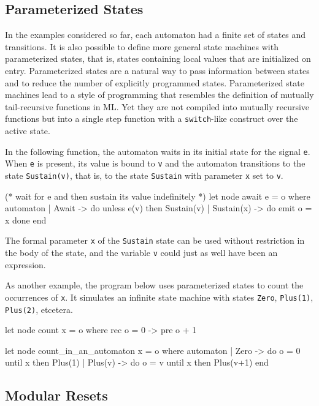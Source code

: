 \documentclass[11pt,titlepage,twoside]{report}
\makeatletter
\newcommand{\zls}[1]{{\@span{class="zelusinline"}#1}}
\newcommand{\zls}[1]{\texttt{#1}}
\renewcommand{\zls}[1]{\texttt{#1}}
\makeatother
\begin{document}
\subsection{Parameterized States\label{paramstates}} %

In the examples considered so far, each automaton had a finite set of states 
and transitions.
It is also possible to define more general state machines with parameterized 
states, that is, states containing local values that are initialized on 
entry.
Parameterized states are a natural way to pass information between states 
and to reduce the number of explicitly programmed states.
Parameterized state machines lead to a style of programming that resembles 
the definition of mutually tail-recursive functions in ML.
Yet they are not compiled into mutually recursive functions but into a 
single step function with a \texttt{switch}-like construct over the active 
state.

In the following function, the automaton waits in its initial state for the 
signal \zls{e}. When \zls{e} is present, its value is bound to \zls{v} and 
the automaton transitions to the state \zls{Sustain(v)}, that is, to the 
state \zls{Sustain} with parameter \zls{x} set to \zls{v}.
\begin{chklisting}[withresult,label=await]
(* wait for e and then sustain its value indefinitely *)
let node await e = o where 
  automaton
  | Await -> do unless e(v) then Sustain(v)
  | Sustain(x) -> do emit o = x done
  end
\end{chklisting}
The formal parameter \zls{x} of the \zls{Sustain} state can be used without 
restriction in the body of the state, and the variable \zls{v} could just as
well have been an expression.

As another example, the program below uses parameterized states to count the 
occurrences of \zls{x}.
It simulates an infinite state machine with states \zls{Zero}, 
\zls{Plus(1)}, \zls{Plus(2)}, etcetera.

\begin{chklisting}[withresult]
let node count x = o where rec o = 0 -> pre o + 1

let node count_in_an_automaton x = o where
  automaton
  | Zero    -> do o = 0 until x then Plus(1)
  | Plus(v) -> do o = v until x then Plus(v+1)
  end
\end{chklisting}

\subsection{Modular Resets\label{resets}} %
\end{document}
